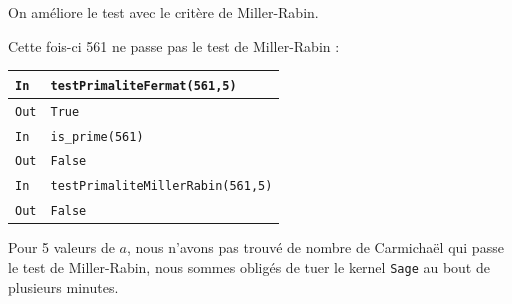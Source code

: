 \documentclass[titlepage]{article}
\begin{document}
    On améliore le test avec le critère de Miller-Rabin.

    

    Cette fois-ci 561 ne passe pas le test de Miller-Rabin : \bigbreak

    \begin{tabularx}{12cm}{|p{0.60cm}|X|}
        \hline
        \rowcolor{gray}
        \texttt{In}
        & 
        \texttt{testPrimaliteFermat(561,5)}
        \\
        \hline
        \texttt{Out}
        &
        \texttt{True}
        \\
        \hline
        \rowcolor{gray}
        \texttt{In}
        & 
        \texttt{is\_prime(561)}
        \\
        \hline
        \texttt{Out}
        &
        \texttt{False}
        \\
        \hline
        \rowcolor{gray}
        \texttt{In}
        & 
        \texttt{testPrimaliteMillerRabin(561,5)}
        \\
        \hline
        \texttt{Out}
        &
        \texttt{False}
        \\
        \hline
        
    \end{tabularx}
    \bigbreak

    Pour 5 valeurs de $a$, nous n'avons pas trouvé de nombre de Carmichaël qui passe le test de Miller-Rabin, nous sommes obligés de tuer le kernel \texttt{Sage} au bout de plusieurs minutes.
\end{document}
